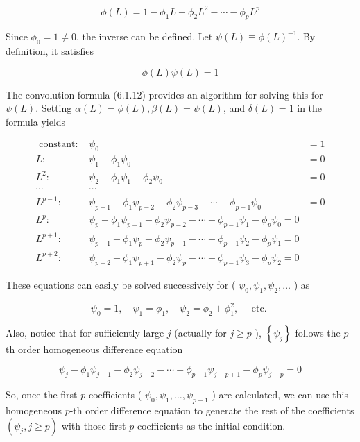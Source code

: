 \documentclass[10pt]{article}
\begin{document}
$$
\phi(L)=1-\phi_{1} L-\phi_{2} L^{2}-\cdots-\phi_{p} L^{p}
$$

Since $\phi_{0}=1 \neq 0$, the inverse can be defined. Let $\psi(L) \equiv \phi(L)^{-1}$. By definition, it satisfies

$$
\phi(L) \psi(L)=1
$$

The convolution formula (6.1.12) provides an algorithm for solving this for $\psi(L)$. Setting $\alpha(L)=\phi(L), \beta(L)=\psi(L)$, and $\delta(L)=1$ in the formula yields

\[
\begin{array}{rcr}
\text { constant: } & \psi_{0} & =1 \\
L: & \psi_{1}-\phi_{1} \psi_{0} & =0 \\
L^{2}: & \psi_{2}-\phi_{1} \psi_{1}-\phi_{2} \psi_{0} & =0 \\
\cdots & \cdots & \\
L^{p-1}: & \psi_{p-1}-\phi_{1} \psi_{p-2}-\phi_{2} \psi_{p-3}-\cdots-\phi_{p-1} \psi_{0} & =0 \\
L^{p}: & \psi_{p}-\phi_{1} \psi_{p-1}-\phi_{2} \psi_{p-2}-\cdots-\phi_{p-1} \psi_{1}-\phi_{p} \psi_{0}=0 \\
L^{p+1}: & \psi_{p+1}-\phi_{1} \psi_{p}-\phi_{2} \psi_{p-1}-\cdots-\phi_{p-1} \psi_{2}-\phi_{p} \psi_{1}=0 \\
L^{p+2}: & \psi_{p+2}-\phi_{1} \psi_{p+1}-\phi_{2} \psi_{p}-\cdots-\phi_{p-1} \psi_{3}-\phi_{p} \psi_{2}=0 \tag{6.1.16}
\end{array}
\]

These equations can easily be solved successively for ( $\psi_{0}, \psi_{1}, \psi_{2}, \ldots$ ) as

$$
\psi_{0}=1, \quad \psi_{1}=\phi_{1}, \quad \psi_{2}=\phi_{2}+\phi_{1}^{2}, \quad \text { etc. }
$$

Also, notice that for sufficiently large $j$ (actually for $j \geq p$ ), $\left\{\psi_{j}\right\}$ follows the $p$-th order homogeneous difference equation


\begin{equation*}
\psi_{j}-\phi_{1} \psi_{j-1}-\phi_{2} \psi_{j-2}-\cdots-\phi_{p-1} \psi_{j-p+1}-\phi_{p} \psi_{j-p}=0 \tag{6.1.17}
\end{equation*}


So, once the first $p$ coefficients ( $\psi_{0}, \psi_{1}, \ldots, \psi_{p-1}$ ) are calculated, we can use this homogeneous $p$-th order difference equation to generate the rest of the coefficients $\left(\psi_{j}, j \geq p\right)$ with those first $p$ coefficients as the initial condition.
\end{document}

